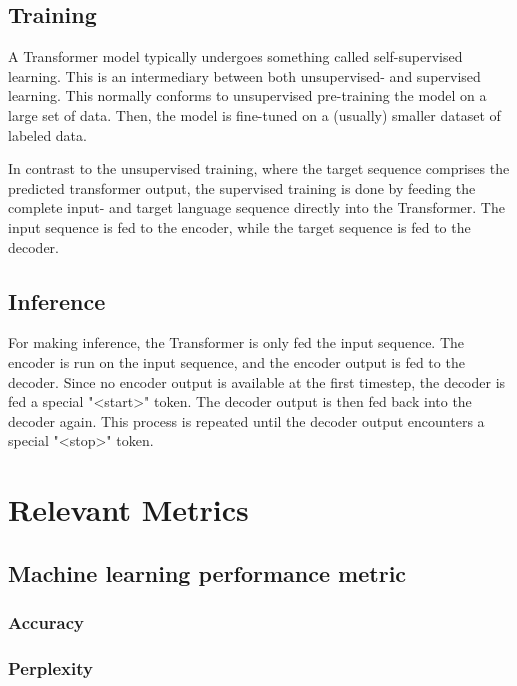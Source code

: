 \subsection{Training}
\label{sec:transformer-training}
A Transformer model typically undergoes something called self-supervised learning. This is an intermediary between both unsupervised- and supervised learning. This normally conforms to unsupervised pre-training the model on a large set of data. Then, the model is fine-tuned on a (usually) smaller dataset of labeled data.

In contrast to the unsupervised training, where the target sequence comprises the predicted transformer output, the supervised training is done by feeding the complete input- and target language sequence directly into the Transformer. The input sequence is fed to the encoder, while the target sequence is fed to the decoder.

\subsection{Inference}
\label{sec:transformer-inference}
For making inference, the Transformer is only fed the input sequence. The encoder is run on the input sequence, and the encoder output is fed to the decoder. Since no encoder output is available at the first timestep, the decoder is fed a special "<start>" token. The decoder output is then fed back into the decoder again. This process is repeated until the decoder output encounters a special "<stop>" token.


\section{Relevant Metrics}
\label{sec:metrics}

\subsection{Machine learning performance metric}
\label{sec:performance-metric}

\subsubsection{Accuracy}
\label{sec:accuracy}

\subsubsection{Perplexity}
\label{sec:perplexity}

